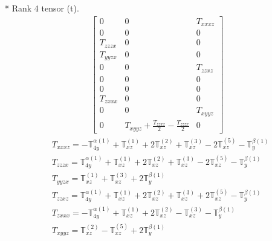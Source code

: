 \documentclass[fleqn,8pt,landscape]{jsarticle}
\begin{document}
* Rank 4 tensor (t).
\begin{align*}
\begin{bmatrix} 0 & 0 & T_{xxxz} \\ 0 & 0 & 0 \\ T_{zzzx} & 0 & 0 \\ T_{yyzx} & 0 & 0 \\ 0 & 0 & T_{zzxz} \\ 0 & 0 & 0 \\ 0 & 0 & 0 \\ T_{zxxx} & 0 & 0 \\ 0 & 0 & T_{xyyz} \\ 0 & T_{xyyz} + \frac{T_{zzxz}}{2} - \frac{T_{zzzx}}{2} & 0 \end{bmatrix}
\end{align*}
\begin{align*}
& T_{xxxz} = - \mathbb{T}_{4y}^{\alpha(1)} + \mathbb{T}_{xz}^{(1)} + 2 \mathbb{T}_{xz}^{(2)} + \mathbb{T}_{xz}^{(3)} - 2 \mathbb{T}_{xz}^{(5)} - \mathbb{T}_{y}^{\beta(1)} \\
& T_{zzzx} = \mathbb{T}_{4y}^{\alpha(1)} + \mathbb{T}_{xz}^{(1)} + 2 \mathbb{T}_{xz}^{(2)} + \mathbb{T}_{xz}^{(3)} - 2 \mathbb{T}_{xz}^{(5)} - \mathbb{T}_{y}^{\beta(1)} \\
& T_{yyzx} = \mathbb{T}_{xz}^{(1)} + \mathbb{T}_{xz}^{(3)} + 2 \mathbb{T}_{y}^{\beta(1)} \\
& T_{zzxz} = \mathbb{T}_{4y}^{\alpha(1)} + \mathbb{T}_{xz}^{(1)} + 2 \mathbb{T}_{xz}^{(2)} + \mathbb{T}_{xz}^{(3)} + 2 \mathbb{T}_{xz}^{(5)} - \mathbb{T}_{y}^{\beta(1)} \\
& T_{zxxx} = - \mathbb{T}_{4y}^{\alpha(1)} + \mathbb{T}_{xz}^{(1)} + 2 \mathbb{T}_{xz}^{(2)} - \mathbb{T}_{xz}^{(3)} - \mathbb{T}_{y}^{\beta(1)} \\
& T_{xyyz} = \mathbb{T}_{xz}^{(2)} - \mathbb{T}_{xz}^{(5)} + 2 \mathbb{T}_{y}^{\beta(1)}
\end{align*}
\end{document}
